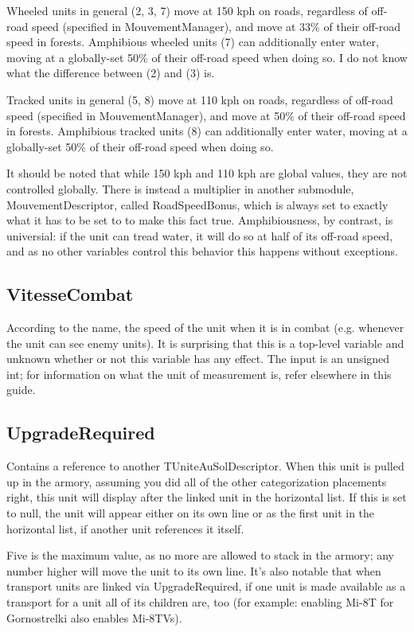 \documentclass{article}
\begin{document}
Wheeled units in general (2, 3, 7) move at 150 kph on roads, regardless of off-road speed (specified in MouvementManager), and move at 33\% of their off-road speed in forests. Amphibious wheeled units (7) can additionally enter water, moving at a globally-set 50\% of their off-road speed when doing so. I do not know what the difference between (2) and (3) is.

Tracked units in general (5, 8) move at 110 kph on roads, regardless of off-road speed (specified in MouvementManager), and move at 50\% of their off-road speed in forests. Amphibious tracked units (8) can additionally enter water, moving at a globally-set 50\% of their off-road speed when doing so.

It should be noted that while 150 kph and 110 kph are global values, they are not controlled globally. There is instead a multiplier in another submodule, MouvementDescriptor, called RoadSpeedBonus, which is always set to exactly what it has to be set to to make this fact true. Amphibiousness, by contrast, is universial: if the unit can tread water, it will do so at half of its off-road speed, and as no other variables control this behavior this happens without exceptions.

\subsection{VitesseCombat}

According to the name, the speed of the unit when it is in combat (e.g. whenever the unit can see enemy units). It is surprising that this is a top-level variable and unknown whether or not this variable has any effect. The input is an unsigned int; for information on what the unit of measurement is, refer elsewhere in this guide.

\subsection{UpgradeRequired}

Contains a reference to another TUniteAuSolDescriptor. When this unit is pulled up in the armory, assuming you did all of the other categorization placements right, this unit will display after the linked unit in the horizontal list. If this is set to null, the unit will appear either on its own line or as the first unit in the horizontal list, if another unit references it itself.

Five is the maximum value, as no more are allowed to stack in the armory; any number higher will move the unit to its own line. It's also notable that when transport units are linked via UpgradeRequired, if one unit is made available as a transport for a unit all of its children are, too (for example: enabling Mi-8T for Gornostrelki also enables Mi-8TVs).
\end{document}
